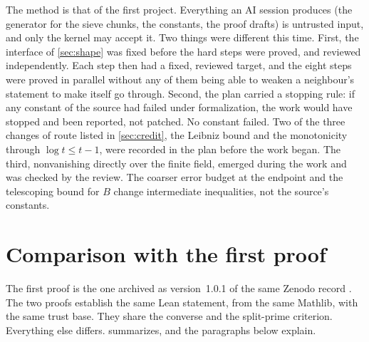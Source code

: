 \documentclass[11pt]{article}
\theoremstyle{definition}
\begin{document}
The method is that of the first project. Everything an AI session produces (the generator for the sieve chunks, the constants, the proof drafts) is untrusted input, and only the kernel may accept it. Two things were different this time. First, the interface of \cref{sec:shape} was fixed before the hard steps were proved, and reviewed independently. Each step then had a fixed, reviewed target, and the eight steps were proved in parallel without any of them being able to weaken a neighbour's statement to make itself go through. Second, the plan carried a stopping rule: if any constant of the source had failed under formalization, the work would have stopped and been reported, not patched. No constant failed. Two of the three changes of route listed in \cref{sec:credit}, the Leibniz bound and the monotonicity through $\log t \le t - 1$, were recorded in the plan before the work began. The third, nonvanishing directly over the finite field, emerged during the work and was checked by the review. The coarser error budget at the endpoint and the telescoping bound for $B$ change intermediate inequalities, not the source's constants.

\section{Comparison with the first proof}\label{sec:comparison}

The first proof is the one archived as version~1.0.1 of the same Zenodo record \cite{CN1paper}. The two proofs establish the same Lean statement, from the same Mathlib, with the same trust base. They share the converse and the split-prime criterion. Everything else differs.  summarizes, and the paragraphs below explain.
\end{document}
